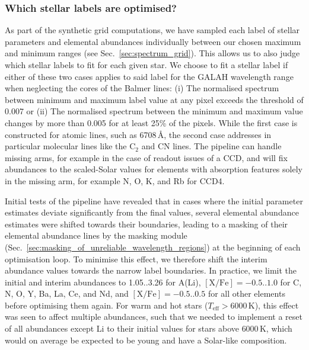 \documentclass[
  journal=pasa,
  manuscript=research-paper, %
  year=2024,
  volume=37
]{cup-journal}
\newcommand\ion[2]{\text{#1\,\textsc{\lowercase{#2}}}}	%
\newcommand{\K}{\,\mathrm{K}}	%
\begin{document}
\subsubsection{Which stellar labels are optimised?} \label{sec:which_labels_are_optimised}


As part of the synthetic grid computations, we have sampled each label of stellar parameters and elemental abundances individually between our chosen maximum and minimum ranges (see Sec.~\ref{sec:spectrum_grid}). This allows us to also judge which stellar labels to fit for each given star. We choose to fit a stellar label if either of these two cases applies to said label for the GALAH wavelength range when neglecting the cores of the Balmer lines: (i) The normalised spectrum between minimum and maximum label value at any pixel exceeds the threshold of 0.007 or (ii) The normalised spectrum between the minimum and maximum value changes by more than 0.005 for at least 25\% of the pixels. While the first case is constructed for atomic lines, such as \ion{Li}{i} 6708\,\AA, the second case addresses in particular molecular lines like the $\mathrm{C_2}$ and $\mathrm{CN}$ lines. The pipeline can handle missing arms, for example in the case of readout issues of a CCD, and will fix abundances to the scaled-Solar values for elements with absorption features solely in the missing arm, for example N, O, K, and Rb for CCD4.

Initial tests of the pipeline have revealed that in cases where the initial parameter estimates deviate significantly from the final values, several elemental abundance estimates were shifted towards their boundaries, leading to a masking of their elemental abundance lines by the masking module (Sec.~\ref{sec:masking_of_unreliable_wavelength_regions}) at the beginning of each optimisation loop. To minimise this effect, we therefore shift the interim abundance values towards the narrow label boundaries. In practice, we limit the initial and interim abundances to 1.05..3.26 for A(Li), $\mathrm{[X/Fe]} = -0.5..1.0$ for C, N, O, Y, Ba, La, Ce, and Nd, and $\mathrm{[X/Fe]} = -0.5..0.5$ for all other elements before optimising them again. For warm and hot stars ($T_\text{eff} > 6000\K$), this effect was seen to affect multiple abundances, such that we needed to implement a reset of all abundances except Li to their initial values for stars above $6000\K$, which would on average be expected to be young and have a Solar-like composition.
\end{document}
